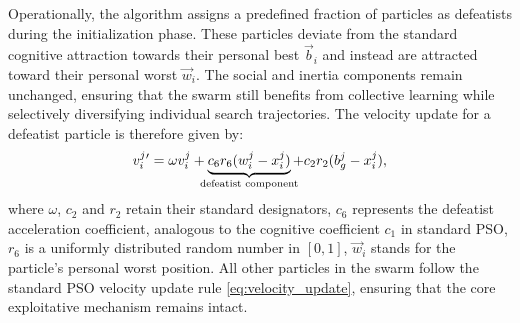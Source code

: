 {Operationally, the algorithm assigns a predefined fraction of particles as defeatists during the initialization phase. These particles deviate from the standard cognitive attraction towards their personal best $\vec{b}_i$ and instead are attracted toward their personal worst $\vec{w}_i$. The social and inertia components remain unchanged, ensuring that the swarm still benefits from collective learning while selectively diversifying individual search trajectories.
The velocity update for a defeatist particle is therefore given by:
\begin{equation}\label{eq:velocity_update_defeatist}
v_{i}^{j}{}'= \omega v_{i}^{j} +
\underbrace{c_6 r_6 (w_{i}^{j} - x_{i}^{j})}_{\mathclap{\text{defeatist component}}} +
c_2 r_2 (b_{g}^{j} - x_{i}^{j}),
\end{equation}
where $\omega$, $c_2$ and $r_2$ retain their standard designators, 
$c_6$ represents the defeatist acceleration coefficient, analogous to the cognitive coefficient $c_1$ in standard PSO,
$r_6$ is a uniformly distributed random number in $[0,1]$,
$\vec{w}_i$ stands for the particle’s personal worst position.
All other particles in the swarm follow the standard PSO velocity update rule \eqref{eq:velocity_update}, ensuring that the core exploitative mechanism remains intact.


\begin{figure}[H]
    \centering
\end{figure}}

